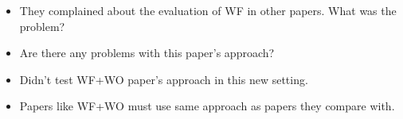 \begin{frame}
  \begin{question}
    \begin{itemize}
      \item They complained about the evaluation of WF in other papers.
        What was the problem?
      \item Are there any problems with this paper's approach?
    \end{itemize}
  \end{question}
\end{frame}

\begin{frame}
  \begin{remark}[Problems]
    \begin{itemize}
      \item Didn't test WF+WO paper's approach in this new setting.
      \item Papers like WF+WO must use same approach as papers they compare 
        with.
    \end{itemize}
  \end{remark}
\end{frame}
